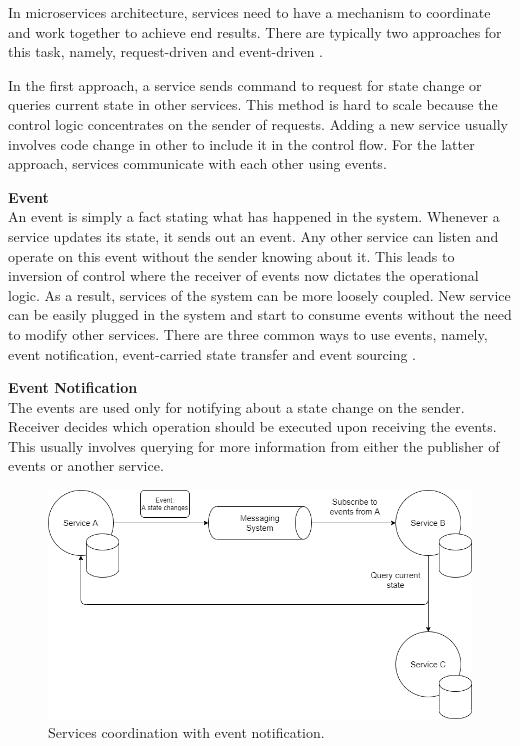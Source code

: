 In microservices architecture, services need to have a mechanism to coordinate and work together to achieve end results. There are typically two approaches for this task, namely, request-driven and event-driven \cite{stopford2018designingeventdriven}.

In the first approach, a service sends command to request for state change or queries current state in other services. This method is hard to scale because the control logic concentrates on the sender of requests. Adding a new service usually involves code change in other to include it in the control flow. For the latter approach, services communicate with each other using events.

\textbf{Event}\\
An event is simply a fact stating what has happened in the system. Whenever a service updates its state, it sends out an event. Any other service can listen and operate on this event without the sender knowing about it. This leads to inversion of control where the receiver of events now dictates the operational logic. As a result, services of the system can be more loosely coupled. New service can be easily plugged in the system and start to consume events without the need to modify other services. There are three common ways to use events, namely, event notification, event-carried state transfer and event sourcing \cite{martinfowlereventdriven}.

\textbf{Event Notification}\\
The events are used only for notifying about a state change on the sender. Receiver decides which operation should be executed upon receiving the events. This usually involves querying for more information from either the publisher of events or another service.   
\begin{figure}[h]
	\includegraphics[width=\linewidth]{images/eventnotification.png}
	\caption{Services coordination with event notification.}
	\label{fig:eventnotification}
\end{figure}

